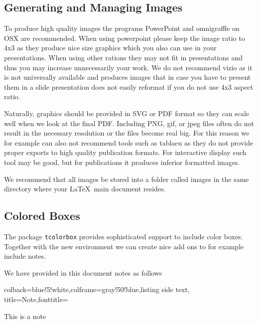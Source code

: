 \subsection{Generating and Managing Images}\label{generating-images}

To produce high quality images the programs PowerPoint and omnigraffle
on OSX are recommended. When using powerpoint please keep the image
ratio to 4x3 as they produce nice size graphics which you also can use
in your presentations. When using other rations they may not fit in
presentations and thus you may increase unnecessarily your work. We do
not recommend vizio as it is not universally available and produces
images that in case you have to present them in a slide presentation
does not easily reformat if you do not use 4x3 aspect ratio.

Naturally, graphics should be provided in SVG or PDF format so they can
scale well when we look at the final PDF. Including PNG, gif, or jpeg
files often do not result in the necessary resolution or the files
become real big. For this reason we for example can also not recommend
tools such as tablaeu as they do not provide proper exports to high
quality publication formats. For interactive display such tool may be
good, but for publications it produces inferior formatted images.

We recommend that all images be stored into a folder called images in
the same directory where your \LaTeX~main document resides.



\subsection{Colored Boxes}

The package \verb|tcolorbox| provides sophisticated support to include
color boxes. Together with the new environment we can create nice add
ons to for example include notes.


We have provided in this document notes as follows


\begin{tcblisting}{colback=blue!5!white,colframe=gray!50!blue,listing side text,  title=Note,fonttitle=\bfseries}
\begin{NOTE}
This is a note
\end{NOTE}
\end{tcblisting}

